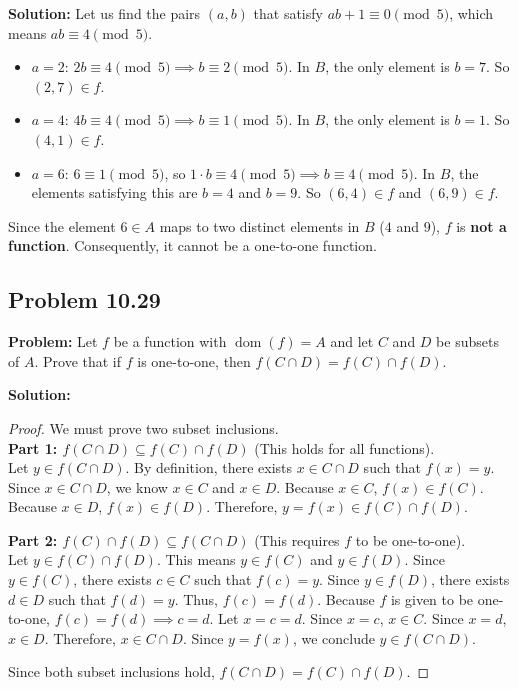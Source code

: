 \documentclass[11pt, a4paper]{article}
\theoremstyle{definition}
\theoremstyle{remark}
\newcommand{\dom}{\operatorname{dom}}
\begin{document}
\textbf{Solution:}
Let us find the pairs $(a,b)$ that satisfy $ab + 1 \equiv 0 \pmod 5$, which means $ab \equiv 4 \pmod 5$.
\begin{itemize}
    \item $a=2$: $2b \equiv 4 \pmod 5 \implies b \equiv 2 \pmod 5$. In $B$, the only element is $b=7$. So $(2,7) \in f$.
    \item $a=4$: $4b \equiv 4 \pmod 5 \implies b \equiv 1 \pmod 5$. In $B$, the only element is $b=1$. So $(4,1) \in f$.
    \item $a=6$: $6 \equiv 1 \pmod 5$, so $1 \cdot b \equiv 4 \pmod 5 \implies b \equiv 4 \pmod 5$. In $B$, the elements satisfying this are $b=4$ and $b=9$. So $(6,4) \in f$ and $(6,9) \in f$.
\end{itemize}
Since the element $6 \in A$ maps to two distinct elements in $B$ ($4$ and $9$), $f$ is \textbf{not a function}. Consequently, it cannot be a one-to-one function.

\subsection{Problem 10.29}
\textbf{Problem:} Let $f$ be a function with $\dom(f) = A$ and let $C$ and $D$ be subsets of $A$. Prove that if $f$ is one-to-one, then $f(C \cap D) = f(C) \cap f(D)$.

\textbf{Solution:}
\begin{proof}
We must prove two subset inclusions. \\
\textbf{Part 1: $f(C \cap D) \subseteq f(C) \cap f(D)$} (This holds for all functions). \\
Let $y \in f(C \cap D)$. By definition, there exists $x \in C \cap D$ such that $f(x) = y$. 
Since $x \in C \cap D$, we know $x \in C$ and $x \in D$. 
Because $x \in C$, $f(x) \in f(C)$. Because $x \in D$, $f(x) \in f(D)$. 
Therefore, $y = f(x) \in f(C) \cap f(D)$.

\textbf{Part 2: $f(C) \cap f(D) \subseteq f(C \cap D)$} (This requires $f$ to be one-to-one). \\
Let $y \in f(C) \cap f(D)$. This means $y \in f(C)$ and $y \in f(D)$. 
Since $y \in f(C)$, there exists $c \in C$ such that $f(c) = y$. 
Since $y \in f(D)$, there exists $d \in D$ such that $f(d) = y$. 
Thus, $f(c) = f(d)$. Because $f$ is given to be one-to-one, $f(c) = f(d) \implies c = d$. 
Let $x = c = d$. Since $x = c$, $x \in C$. Since $x = d$, $x \in D$. 
Therefore, $x \in C \cap D$. Since $y = f(x)$, we conclude $y \in f(C \cap D)$. 

Since both subset inclusions hold, $f(C \cap D) = f(C) \cap f(D)$.
\end{proof}
\end{document}

